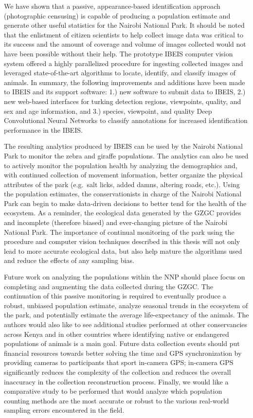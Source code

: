 
We have shown that a passive, appearance-based identification approach (photographic censusing) is capable of producing a population estimate and generate other useful statistics for the Nairobi National Park.  It should be noted that the enlistment of citizen scientists to help collect image data was critical to its success and the amount of coverage and volume of images collected would not have been possible without their help. The prototype IBEIS computer vision system offered a highly parallelized procedure for ingesting collected images and leveraged state-of-the-art algorithms to locate, identify, and classify images of animals.  In summary, the following improvements and additions have been made to IBEIS and its support software: 1.) new software to submit data to IBEIS, 2.) new web-based interfaces for turking detection regions, viewpoints, quality, and sex and age information, and 3.) species, viewpoint, and quality Deep Convolutional Neural Networks to classify annotations for increased identification performance in the IBEIS.  

The resulting analytics produced by IBEIS can be used by the Nairobi National Park to monitor the zebra and giraffe populations.  The analytics can also be used to actively monitor the population health by analyzing the demographics and, with continued collection of movement information, better organize the physical attributes of the park (e.g.\ salt licks, added damns, altering roads, etc.).  Using the population estimates, the conservationists in charge of the Nairobi National Park can begin to make data-driven decisions to better tend for the health of the ecosystem.  As a reminder, the ecological data generated by the GZGC provides and incomplete (therefore biased) and ever-changing picture of the Nairobi National Park.  The importance of continual monitoring of the park using the procedure and computer vision techniques described in this thesis will not only lead to more accurate ecological data, but also help mature the algorithms used and reduce the effects of any sampling bias.

Future work on analyzing the populations within the NNP should place focus on completing and augmenting the data collected during the GZGC.  The continuation of this passive monitoring is required to eventually produce a robust, unbiased population estimate, analyze seasonal trends in the ecosystem of the park, and potentially estimate the average life-expectancy of the animals.  The authors would also like to see additional studies performed at other conservancies across Kenya and in other countries where identifying native or endangered populations of animals is a main goal.  Future data collection events should put financial resources towards better solving the time and GPS synchronization by providing cameras to participants that sport in-camera GPS;  in-camera GPS significantly reduces the complexity of the collection and reduces the overall inaccuracy in the collection reconstruction process.  Finally, we would like a comparative study to be performed that would analyze which population counting methods are the most accurate or robust to the various real-world sampling errors encountered in the field.

